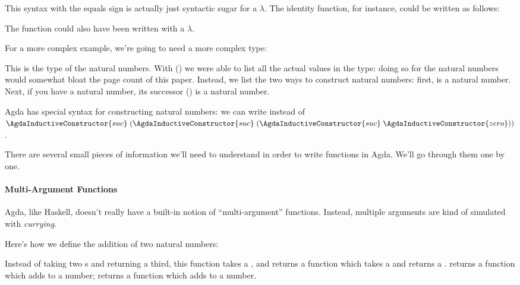 This syntax with the equals sign is actually just syntactic sugar for a \(\lambda\).
The identity function, for instance, could be written as follows:
\begin{agdalisting*}
\end{agdalisting*}
The  function could also have been written with a \(\lambda\).
\begin{agdalisting*}
\end{agdalisting*}


For a more complex example, we're going to need a more complex type:
\begin{agdalisting}
\end{agdalisting}
This is the type of the natural numbers.
With  () we were able to list all the
actual values in the type: doing so for the natural numbers would somewhat bloat
the page count of this paper.
Instead, we list the two ways to construct natural numbers: first,
 is a natural number.
Next, if you have a natural number, its successor
() is a natural number.

Agda has special syntax for constructing natural numbers: we can write
 instead of
\(\AgdaInductiveConstructor{suc}\;(\AgdaInductiveConstructor{suc}\;(\AgdaInductiveConstructor{suc}\;\AgdaInductiveConstructor{zero}))\).

There are several small pieces of information we'll need to understand in order
to write functions in Agda.
We'll go through them one by one.
\paragraph{Multi-Argument Functions}
Agda, like Haskell, doesn't really have a built-in notion of ``multi-argument''
functions.
Instead, multiple arguments are kind of simulated with \emph{currying}.

Here's how we define the addition of two natural numbers:
\begin{agdalisting*}
\end{agdalisting*}
Instead of taking two \Nat s and returning a third, this function takes a
\Nat, and returns a function which takes a \Nat and returns a
\Nat.
\; returns a function which
adds  to a number; \; returns a
function which adds  to a number.
